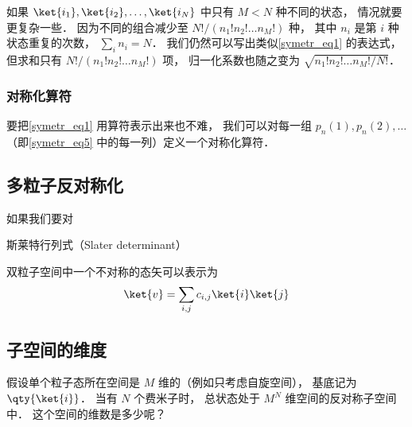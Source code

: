 如果 $\ket{i_1},\ket{i_2},\dots,\ket{i_N}$ 中只有 $M < N$ 种不同的状态， 情况就要更复杂一些． 因为不同的组合减少至 $N!/(n_1! n_2! \dots n_M!)$ 种， 其中 $n_i$ 是第 $i$ 种状态重复的次数， $\sum_i n_i = N$． 我们仍然可以写出类似\autoref{symetr_eq1} 的表达式， 但求和只有 $N!/(n_1! n_2! \dots n_M!)$ 项， 归一化系数也随之变为 $\sqrt{n_1! n_2! \dots n_M!/N!}$．

\subsubsection{对称化算符}
要把\autoref{symetr_eq1} 用算符表示出来也不难， 我们可以对每一组 $p_n(1), p_n(2), \dots$ （即\autoref{symetr_eq5} 中的每一列）定义一个对称化算符．

\subsection{多粒子反对称化}
如果我们要对



斯莱特行列式（Slater determinant）

双粒子空间中一个不对称的态矢可以表示为
\begin{equation}
\ket{v} = \sum_{i,j} c_{i,j} \ket{i}\ket{j}
\end{equation}

\subsection{子空间的维度}
假设单个粒子态所在空间是 $M$ 维的（例如只考虑自旋空间）， 基底记为 $\qty{\ket{i}}$． 当有 $N$ 个费米子时， 总状态处于 $M^N$ 维空间的反对称子空间中． 这个空间的维数是多少呢？  


